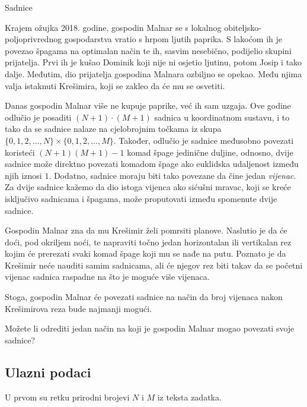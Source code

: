 \begin{statement}[
  problempoints=100,
  timelimit=3 sekunde,
  memorylimit=512 MiB,
]{Sadnice}

Krajem ožujka 2018. godine, gospodin Malnar se s lokalnog
obiteljsko-poljoprivrednog gospodarstva vratio s hrpom ljutih paprika.
S lakoćom ih je povezao špagama na optimalan način te ih, sasvim nesebično,
podijelio skupini prijatelja. Prvi ih je kušao Dominik koji nije ni osjetio
ljutinu, potom Josip i tako dalje. Međutim, dio prijatelja gospodina Malnara
ozbiljno se opekao. Među njima valja istaknuti Krešimira, koji se zakleo da
će mu se osvetiti.

Danas gospodin Malnar više ne kupuje paprike, već ih sam uzgaja. Ove godine
odlučio je posaditi $(N+1) \cdot (M+1)$ sadnica u koordinatnom sustavu, i to
tako da se sadnice nalaze na cjelobrojnim točkama iz skupa $\{0,1,2,\dots,N\}
\times \{0,1,2,\dots,M\}$. Također, odlučio je sadnice međusobno povezati
koristeći $(N+1)(M+1)-1$ komad špage jedinične duljine, odnosno, dvije
sadnice može direktno povezati komadom špage ako euklidska udaljenost između
njih iznosi $1$. Dodatno, sadnice moraju biti tako povezane da čine jedan
\textit{vijenac}. Za dvije sadnice kažemo da dio istoga vijenca ako sićušni
mravac, koji se kreće isključivo sadnicama i špagama, može proputovati između
spomenute dvije sadnice.

Gospodin Malnar zna da mu Krešimir želi pomrsiti planove. Naslutio je da će
doći, pod okriljem noći, te napraviti točno jedan horizontalan ili
vertikalan rez kojim će prerezati svaki komad špage koji mu se nađe na putu.
Poznato je da Krešimir neće nauditi samim sadnicama, ali će njegov rez biti
takav da se početni vijenac sadnica raspadne na što je moguće više vijenaca.

Stoga, gospodin Malnar će povezati sadnice na način da broj vijenaca nakon
Krešimirova reza bude najmanji mogući.

Možete li odrediti jedan način na koji je gospodin Malnar mogao povezati
svoje sadnice?

\subsection*{Ulazni podaci}
U prvom su retku prirodni brojevi $N$ i $M$ iz teksta zadatka.


\end{statement}
